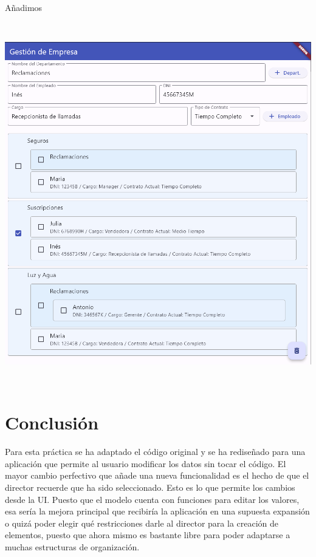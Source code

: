 \documentclass[
]{article}
\begin{document}
Añadimos

\includegraphics[width=5.90522in,height=6.20833in]{imagenes/Funcionamiento4.png}

\section{Conclusión}\label{conclusiuxf3n}

Para esta práctica se ha adaptado el código original y se ha rediseñado
para una aplicación que permite al usuario modificar los datos sin tocar
el código. El mayor cambio perfectivo que añade una nueva funcionalidad
es el hecho de que el director recuerde que ha sido seleccionado. Esto
es lo que permite los cambios desde la UI. Puesto que el modelo cuenta
con funciones para editar los valores, esa sería la mejora principal que
recibiría la aplicación en una supuesta expansión o quizá poder elegir
qué restricciones darle al director para la creación de elementos,
puesto que ahora mismo es bastante libre para poder adaptarse a muchas
estructuras de organización.
\end{document}
